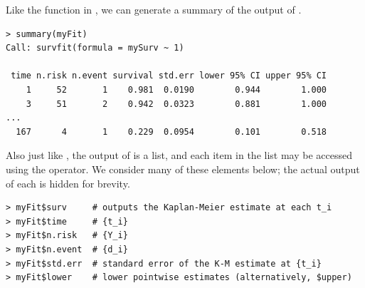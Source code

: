 \documentclass[article]{jss}
\begin{document}
Like the  function in , we can generate a summary of the output of .
\begin{verbatim}
> summary(myFit)
Call: survfit(formula = mySurv ~ 1)

 time n.risk n.event survival std.err lower 95% CI upper 95% CI
    1     52       1    0.981  0.0190        0.944        1.000
    3     51       2    0.942  0.0323        0.881        1.000
...
  167      4       1    0.229  0.0954        0.101        0.518
\end{verbatim}
Also just like , the output of  is a list, and each item in the list may be accessed using the \code{$} operator. We consider many of these elements below; the actual output of each is hidden for brevity.
\begin{verbatim}
> myFit$surv     # outputs the Kaplan-Meier estimate at each t_i
> myFit$time     # {t_i}
> myFit$n.risk   # {Y_i}
> myFit$n.event  # {d_i}
> myFit$std.err  # standard error of the K-M estimate at {t_i}
> myFit$lower    # lower pointwise estimates (alternatively, $upper)
\end{verbatim}
\end{document}
